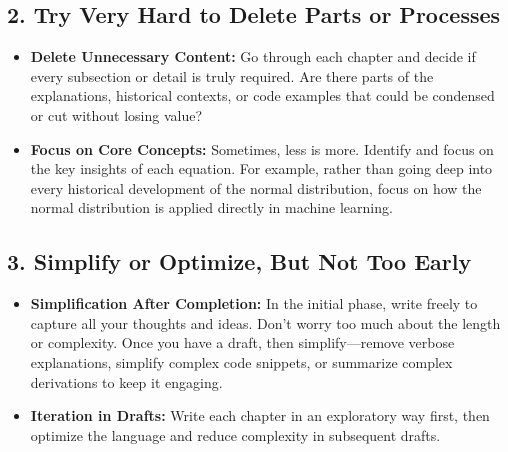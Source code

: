 \documentclass[
  12 pt,
  a4paper,
]{book}
\providecommand{\tightlist}{%
  \setlength{\itemsep}{0pt}\setlength{\parskip}{0pt}}
\numberwithin{equation}{section}
\theoremstyle{plain}      %
\theoremstyle{definition} %
\theoremstyle{remark}     %
\theoremstyle{note}         %
\begin{document}
\hypertarget{try-very-hard-to-delete-parts-or-processes}{%
\subsection*{\texorpdfstring{2. \textbf{Try Very Hard to Delete Parts or
Processes}}{2. Try Very Hard to Delete Parts or Processes}}\label{try-very-hard-to-delete-parts-or-processes}}

\begin{itemize}
\tightlist
\item
  \textbf{Delete Unnecessary Content:} Go through each chapter and
  decide if every subsection or detail is truly required. Are there
  parts of the explanations, historical contexts, or code examples that
  could be condensed or cut without losing value?
\item
  \textbf{Focus on Core Concepts:} Sometimes, less is more. Identify and
  focus on the key insights of each equation. For example, rather than
  going deep into every historical development of the normal
  distribution, focus on how the normal distribution is applied directly
  in machine learning.
\end{itemize}

\hypertarget{simplify-or-optimize-but-not-too-early}{%
\subsection*{\texorpdfstring{3. \textbf{Simplify or Optimize, But Not
Too
Early}}{3. Simplify or Optimize, But Not Too Early}}\label{simplify-or-optimize-but-not-too-early}}

\begin{itemize}
\tightlist
\item
  \textbf{Simplification After Completion:} In the initial phase, write
  freely to capture all your thoughts and ideas. Don't worry too much
  about the length or complexity. Once you have a draft, then
  simplify---remove verbose explanations, simplify complex code
  snippets, or summarize complex derivations to keep it engaging.
\item
  \textbf{Iteration in Drafts:} Write each chapter in an exploratory way
  first, then optimize the language and reduce complexity in subsequent
  drafts.
\end{itemize}
\end{document}
